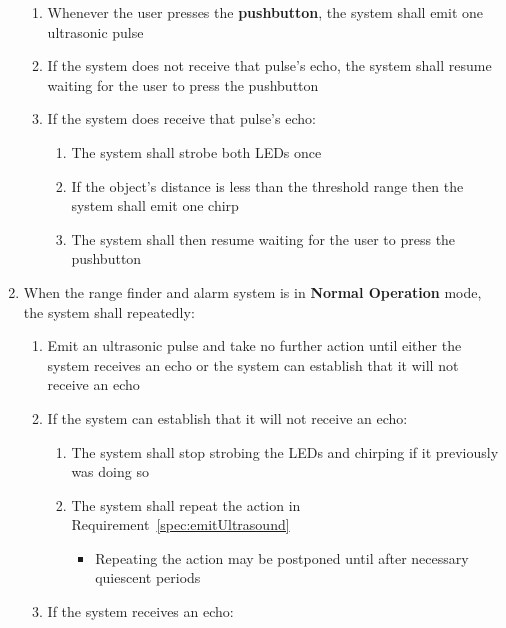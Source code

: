 \begin{enumerate}
\begin{enumerate}
            \item Whenever the user presses the \textbf{pushbutton}, the system shall emit one ultrasonic pulse
            \item If the system does not receive that pulse's echo, the system shall resume waiting for the user to press the pushbutton
            \item \label{spec:singlePulseResponse} If the system does receive that pulse's echo:
                \begin{enumerate}
                    \item The system shall strobe both LEDs once
                    \item If the object's distance is less than the threshold range then the system shall emit one chirp
                    \item The system shall then resume waiting for the user to press the pushbutton
                \end{enumerate}
        \end{enumerate}
    \item \label{spec:normalOperation} When the range finder and alarm system is in \textbf{Normal Operation} mode, the system shall repeatedly:
        \begin{enumerate}
            \item \label{spec:emitUltrasound} Emit an ultrasonic pulse and take no further action until either the system receives an echo or the system can establish that it will not receive an echo
            \item If the system can establish that it will not receive an echo:
                \begin{enumerate}
                    \item The system shall stop strobing the LEDs and chirping if it previously was doing so
                    \item The system shall repeat the action in Requirement~\ref{spec:emitUltrasound}
                        {\footnotesize
                        \begin{itemize}
                             \item Repeating the action may be postponed until after necessary quiescent periods
                        \end{itemize}}
                \end{enumerate}
            \item If the system receives an echo:
                \begin{enumerate}

\end{enumerate}
\end{enumerate}
\end{enumerate}
